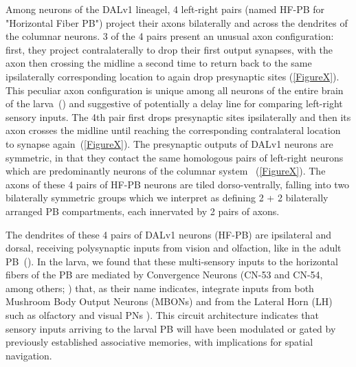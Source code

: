 \documentclass{article}
\begin{document}
Among neurons of the DALv1 lineagel, 4 left-right pairs (named HF-PB for "Horizontal Fiber PB") project their axons bilaterally and across the dendrites of the columnar neurons.
3 of the 4 pairs present an unusual axon configuration: first, they project contralaterally to drop their first output synapses, with the axon then crossing the midline a second time to return back to the same ipsilaterally corresponding location to again drop presynaptic sites (\ref{FigureX}).
This peculiar axon configuration is unique among all neurons of the entire brain of the larva~(\citep{winding2023}) and suggestive of potentially a delay line for comparing left-right sensory inputs.
The 4th pair first drops presynaptic sites ipsilaterally and then its axon crosses the midline until reaching the corresponding contralateral location to synapse again~(\ref{FigureX}).
The presynaptic outputs of DALv1 neurons are symmetric, in that they contact the same homologous pairs of left-right neurons which are predominantly neurons of the columnar system ~(\ref{FigureX}).
The axons of these 4 pairs of HF-PB neurons are tiled dorso-ventrally, falling into two bilaterally symmetric groups which we interpret as defining 2 + 2 bilaterally arranged PB compartments, each innervated by 2 pairs of axons. %

The dendrites of these 4 pairs of DALv1 neurons (HF-PB) are ipsilateral and dorsal, receiving polysynaptic inputs from vision and olfaction, like in the adult PB~(\citep{hulse2021connectome}). In the larva, we found that these multi-sensory inputs to the horizontal fibers of the PB are mediated by Convergence Neurons (CN-53 and CN-54, among others; \citealp{eschbach2021}) that, as their name indicates, integrate inputs from both Mushroom Body Output Neurons (MBONs) and from the Lateral Horn (LH) such as olfactory and visual PNs \citep{EsbachFushiki2021}). This circuit architecture indicates that sensory inputs arriving to the larval PB will have been modulated or gated by previously established associative memories, with implications for spatial navigation.
\end{document}
